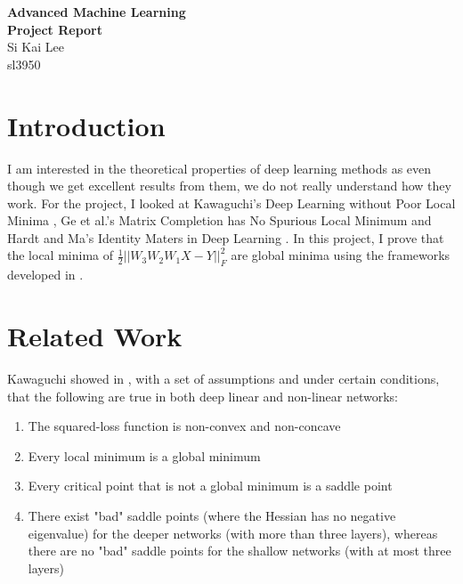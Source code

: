 \documentclass[12pt]{article}
\begin{document}
\begin{center}
  \Large \textbf{Advanced Machine Learning} \\
  \Large \textbf{Project Report} \\
  \vspace{0.1in}
  \normalsize Si Kai Lee \\
  \normalsize sl3950 \\
\end{center}

\section*{Introduction}

I am interested in the theoretical properties of deep learning methods as even though we get excellent results from them, we do not really understand how they work. For the project, I looked at Kawaguchi's Deep Learning without Poor Local Minima \cite{kawaguchi2016deep}, Ge et al.'s Matrix Completion has No Spurious Local Minimum \cite{ge2016matrix} and Hardt and Ma's Identity Maters in Deep Learning \cite{hardt2016identity}. In this project, I prove that the local minima of $\frac{1}{2}||W_3 W_2 W_1 X -Y||_F^2$ are global minima using the frameworks developed in \cite{hardt2016identity}. %

\section*{Related Work}
Kawaguchi showed in \cite{kawaguchi2016deep}, with a set of assumptions and under certain conditions, that the following are true in both deep linear and non-linear networks: 
\begin{enumerate}
\item The squared-loss function is non-convex and non-concave
\item Every local minimum is a global minimum
\item Every critical point that is not a global minimum is a saddle point
\item There exist "bad" saddle points (where the Hessian has no negative eigenvalue) for the deeper networks (with more than three layers), whereas there are no "bad" saddle points for the shallow networks (with at most three layers)
\end{enumerate}
 
\end{document}
